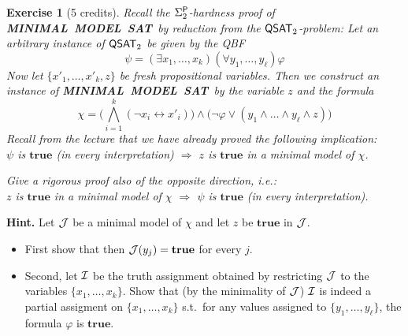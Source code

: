 \documentclass [11pt]{article}
\newcommand{\Ra}{\Rightarrow}
\renewcommand{\phi}{\varphi}
\newcommand{\ccfont}[1]{\protect\mathsf{#1}}
\newcommand{\Ptime}{\ccfont{P}}
\newcommand{\phs}[1]{\Sigma_{#1}^{\Ptime}}
\newcommand{\php}[1]{\Pi_{#1}^{\Ptime}}
\newcommand{\QSAT}[1]{\ccfont{QSAT}_{#1}}
\newcommand{\MINSAT}{\mbox{\bf MINIMAL MODEL SAT}}
\newcommand{\True}{\mathbf{true}}
\newtheorem{exercise}[theorem]{Exercise}
\begin{document}
%
%
%

\newpage

\noindent
\begin{exercise}[5 credits]
{\em Recall the $\phs{2}$-hardness proof of \MINSAT\ by reduction from the $\QSAT{2}$-problem: 
%
Let an arbitrary instance of $\QSAT{2}$ be given by the 
QBF
%
$$\psi = (\exists x_1, \dots, x_k) 
(\forall y_1, \dots, y_\ell) \phi
$$
%
%
Now let $\{x'_1, \dots, x'_k, z\}$ be fresh propositional variables.
Then we construct an instance of 
\MINSAT\ by the {\em variable $z$} and the {\em formula} 
%
$$\chi =  
\big(\bigwedge_{i=1}^k (\neg x_i \leftrightarrow x'_i) \big)
\wedge \big( \neg \phi \vee (y_1 \wedge \dots 
\wedge y_\ell \wedge z)\big)
$$
%
Recall from the lecture that we have already proved the following 
implication:  \\
$\psi$ is $\True$ (in every interpretation) $\Ra$ $z$ is $\True$ in a minimal model of $\chi$.


\smallskip
\noindent
Give a rigorous proof also of the opposite direction, i.e.: \\
$z$ is $\True$ in a minimal model of $\chi$ 
$\Ra$ $\psi$ is $\True$ (in every interpretation).
} %
\end{exercise}


\noindent
{\bf Hint.} Let ${\cal J}$ be 
a minimal model of $\chi$ and let 
$z$ be $\True$ in ${\cal J}$. 
\begin{itemize}
\item First show that then 
${\cal J} (y_j) = \True$ for every $j$.
\item
Second, let ${\cal I}$ be the truth assignment obtained by 
restricting ${\cal J}$ to the variables 
$\{x_1, \dots, x_k \}$. Show that (by the minimality of ${\cal J}$)
${\cal I}$ is indeed a 
partial assigment on $\{x_1, \dots, x_k\}$ s.t.\ for any values assigned to $\{y_1, \dots, y_\ell\}$, the formula $\phi$ is $\True$. 
\end{itemize}
\end{document}
